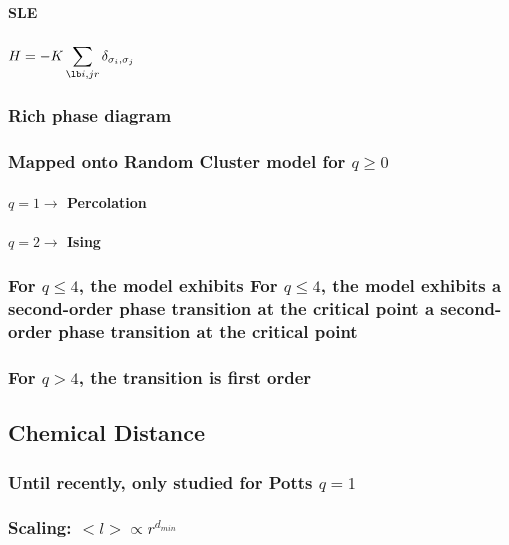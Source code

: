 \documentclass[pre,preprint]{revtex4-1}
\begin{document}
\paragraph{SLE}
\label{sec-1.1.2.6}
\subsubsection{$H=-K \displaystyle\sum_{\lb i,j r} \delta_{\sigma_i, \sigma_j}$}
\label{sec-1.1.3}
\subsubsection{Rich phase diagram}
\label{sec-1.1.4}
\subsubsection{Mapped onto Random Cluster model for $q \ge 0$}
\label{sec-1.1.5}
\paragraph{$q = 1 \to$ Percolation}
\label{sec-1.1.5.1}
\paragraph{$q = 2 \to$ Ising}
\label{sec-1.1.5.2}
\subsubsection{For $q \le 4$, the model exhibits For $q \le 4$, the model exhibits a second-order phase transition at the critical point a second-order phase transition at the critical point}
\label{sec-1.1.6}
\subsubsection{For $q>4$, the transition is first order \cite{Bax}}
\label{sec-1.1.7}
\subsection{Chemical Distance}
\label{sec-1.2}
\subsubsection{Until recently, only studied for Potts $q=1$}
\label{sec-1.2.1}
\subsubsection{Scaling: $< l > \propto r^{d_{min}}$}
\label{sec-1.2.2}
\end{document}
